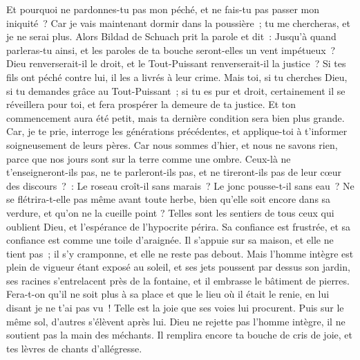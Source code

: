 \begin{multicols}{2}
Et pourquoi ne pardonnes-tu pas mon péché, et ne fais-tu pas passer mon iniquité~? Car je vais maintenant dormir dans la poussière~; tu me chercheras, et je ne serai plus.
\VerseOne{}Alors Bildad de Schuach prit la parole et dit~:
Jusqu'à quand parleras-tu ainsi, et les paroles de ta bouche seront-elles un vent impétueux~?
Dieu renverserait-il le droit, et le Tout-Puissant renverserait-il la justice~?
Si tes fils ont péché contre lui, il les a livrés à leur crime.
Mais toi, si tu cherches Dieu, si tu demandes grâce au Tout-Puissant~;
si tu es pur et droit, certainement il se réveillera pour toi, et fera prospérer la demeure de ta justice.
Et ton commencement aura été petit, mais ta dernière condition sera bien plus grande.
Car, je te prie, interroge les générations précédentes, et applique-toi à t'informer soigneusement de leurs pères.
Car nous sommes d'hier, et nous ne savons rien, parce que nos jours sont sur la terre comme une ombre.
Ceux-là ne t'enseigneront-ils pas, ne te parleront-ils pas, et ne tireront-ils pas de leur cœur des discours~?~:
Le roseau croît-il sans marais~? Le jonc pousse-t-il sans eau~?
Ne se flétrira-t-elle pas même avant toute herbe, bien qu'elle soit encore dans sa verdure, et qu'on ne la cueille point ?
Telles sont les sentiers de tous ceux qui oublient Dieu, et l'espérance de l'hypocrite périra.
Sa confiance est frustrée, et sa confiance est comme une toile d'araignée.
Il s'appuie sur sa maison, et elle ne tient pas~; il s'y cramponne, et elle ne reste pas debout.
Mais l'homme intègre est plein de vigueur étant exposé au soleil, et ses jets poussent par dessus son jardin,
ses racines s'entrelacent près de la fontaine, et il embrasse le bâtiment de pierres.
Fera-t-on qu'il ne soit plus à sa place et que le lieu où il était le renie, en lui disant je ne t'ai pas vu~! 
Telle est la joie que ses voies lui procurent. Puis sur le même sol, d'autres s'élèvent après lui.
Dieu ne rejette pas l'homme intègre, il ne soutient pas la main des méchants.
Il remplira encore ta bouche de cris de joie, et tes lèvres de chants d'allégresse.

\end{multicols}
